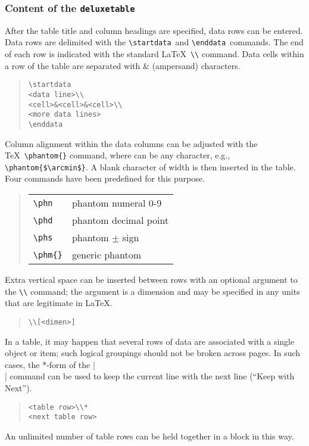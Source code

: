 \documentclass[preprint2]{aastex}
\begin{document}
\subsubsection{Content of the {\tt deluxetable}} 
 
After the table title and column headings are specified, 
data rows can be entered. 
Data rows are delimited with the \verb"\startdata"\ 
 and \verb"\enddata"\ 
 commands. 
The end of each row is indicated with the standard \LaTeX\ \verb"\\" command. 
Data cells within a row of the table are separated with \& (ampersand) characters. 
\begin{quote} 
\begin{verbatim} 
\startdata 
<data line>\\ 
<cell>&<cell>&<cell>\\ 
<more data lines> 
\enddata 
\end{verbatim} 
\end{quote} 
 
Column alignment within the data columns can be adjusted with the \TeX\ 
\verb"\phantom{"\verb"}" command, 
where  can be any character, e.g., \verb"\phantom{$\arcmin$}". 
A blank character of width \m{string} is then inserted in the table. 
Four commands have been predefined for this purpose. 
\begin{quote} 
\begin{tabular}{l@{\quad}p{2in}} 
{\verb"\phn"%
} & {phantom numeral 0-9}\\ 
{\verb"\phd"%
} & {phantom decimal point}\\ 
{\verb"\phs"%
} & {phantom $\pm$ sign}\\ 
{\verb"\phm{"\m{string}\verb"}"} & {generic phantom}\\ 
\end{tabular} 
\end{quote} 
 
Extra vertical space can be inserted between rows with an optional argument to the 
\verb"\\" command; the argument is a dimension 
and may be specified in any units that are legitimate in \LaTeX. 
\begin{quote} 
\begin{verbatim} 
\\[<dimen>] 
\end{verbatim} 
\end{quote} 
 
In a table, it may happen that several rows of data are 
associated with a single object or item; 
such logical groupings should not be broken across pages. 
In such cases, the *-form of the |\\| command can be used to 
keep the current line with the next line (``Keep with Next''). 
\begin{quote} 
\begin{verbatim} 
<table row>\\* 
<next table row> 
\end{verbatim} 
\end{quote} 
An unlimited number of table rows can be held together in a block in this way. 
 
\end{document}
